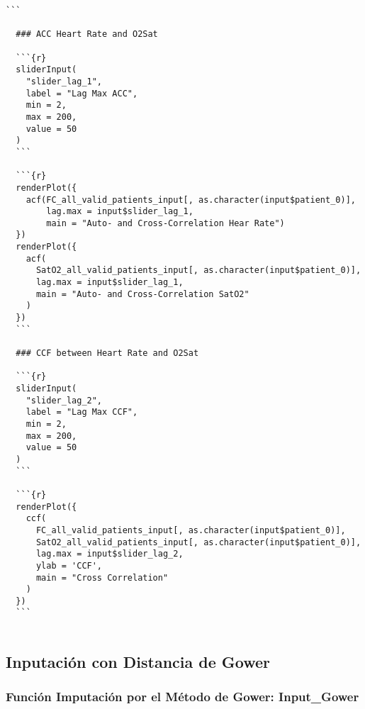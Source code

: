 \begin{lstlisting}[style=mystyle,caption={Código Visualización de los Datos}, label={lst:codigo-visualizacion}]
  ```
  
  ### ACC Heart Rate and O2Sat
  
  ```{r}
  sliderInput(
    "slider_lag_1",
    label = "Lag Max ACC",
    min = 2,
    max = 200,
    value = 50
  )
  ```
  
  ```{r}
  renderPlot({
    acf(FC_all_valid_patients_input[, as.character(input$patient_0)],
        lag.max = input$slider_lag_1,
        main = "Auto- and Cross-Correlation Hear Rate")
  })
  renderPlot({
    acf(
      SatO2_all_valid_patients_input[, as.character(input$patient_0)],
      lag.max = input$slider_lag_1,
      main = "Auto- and Cross-Correlation SatO2"
    )
  })
  ```
  
  ### CCF between Heart Rate and O2Sat
  
  ```{r}
  sliderInput(
    "slider_lag_2",
    label = "Lag Max CCF",
    min = 2,
    max = 200,
    value = 50
  )
  ```
  
  ```{r}
  renderPlot({
    ccf(
      FC_all_valid_patients_input[, as.character(input$patient_0)],
      SatO2_all_valid_patients_input[, as.character(input$patient_0)],
      lag.max = input$slider_lag_2,
      ylab = 'CCF',
      main = "Cross Correlation"
    )
  })
  ```
  
\end{lstlisting}


\subsection{Inputación con Distancia de Gower}\label{sec:codigo-input-gower}

\subsubsection{Función Imputación por el Método de Gower: Input\_Gower}\label{sec:codigo-input-gower-fun}


